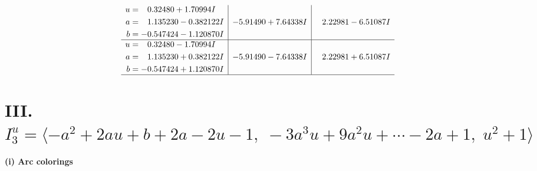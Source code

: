 \documentclass[1p]{elsarticle_modified}
\theoremstyle{definition}
\begin{document}
$$\begin{array}{c|c|c}
\begin{aligned}
u &= \phantom{-}0.32480 + 1.70994 I \\
a &= \phantom{-}1.135230 - 0.382122 I \\
b &= -0.547424 - 1.120870 I\end{aligned}
 & -5.91490 + 7.64338 I & \phantom{-}2.22981 - 6.51087 I \\ \hline\begin{aligned}
u &= \phantom{-}0.32480 - 1.70994 I \\
a &= \phantom{-}1.135230 + 0.382122 I \\
b &= -0.547424 + 1.120870 I\end{aligned}
 & -5.91490 - 7.64338 I & \phantom{-}2.22981 + 6.51087 I\\
 \hline 
 \end{array}$$\newpage\newpage\renewcommand{\arraystretch}{1}
\centering \section*{III. $I^u_{3}= \langle - a^2+2 a u+b+2 a-2 u-1,\;-3 a^3 u+9 a^2 u+\cdots-2 a+1,\;u^2+1 \rangle$}
\flushleft \textbf{(i) Arc colorings}\\
\end{document}
